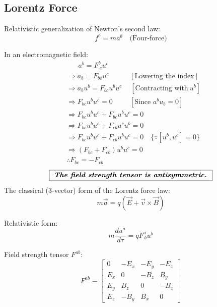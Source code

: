 \documentclass[14pt]{article} %
\begin{document}
\subsection*{Lorentz Force}

Relativistic generalization of Newton's second law:
\[
f^b = m a^b \quad \text{(Four-force)}
\]

In an electromagnetic field:
\begin{align*}
    &\quad~~~ a^b = F^b_{\ c} u^c \\
   &\Rightarrow a_b = F_{bc} u^c \quad \quad\quad [\text{Lowering the index}] \\
   &\Rightarrow a_b u^b = F_{bc} u^b u^c \quad~[\text{Contracting with}~u^b] \\
   &\Rightarrow F_{bc} u^b u^c = 0 \quad~~\quad[\text{Since }a^b u_b = 0] \\  
   &\Rightarrow F_{bc} u^b u^c + F_{bc} u^b u^c = 0 \\
   &\Rightarrow F_{bc} u^b u^c + F_{cb} u^c u^b = 0 \\
   &\Rightarrow F_{bc} u^b u^c + F_{cb} u^b u^c = 0 \quad\{\because [u^b,u^c]=0 \}\\
    &\Rightarrow \left(F_{bc} + F_{cb}\right) u^b u^c = 0 \\
    &\therefore F_{bc} = -F_{cb}  
\end{align*}
$$\fbox{
\textbf{\textit{The field strength tensor is antisymmetric.}}
}
$$
The classical (3-vector) form of the Lorentz force law:
\[
m \vec{a} = q \left( \vec{E} + \vec{v} \times \vec{B} \right)
\]

Relativistic form:
\[
m \frac{du^a}{d\tau} = q F^a_{\ b} u^b
\]

Field strength tensor $F^{ab}$:
\[
F^{ab} \equiv
\begin{bmatrix}
0 & -E_x & -E_y & -E_z \\
E_x & 0 & -B_z & B_y \\
E_y & B_z & 0 & -B_x \\
E_z & -B_y & B_x & 0
\end{bmatrix}
\]
\end{document}
